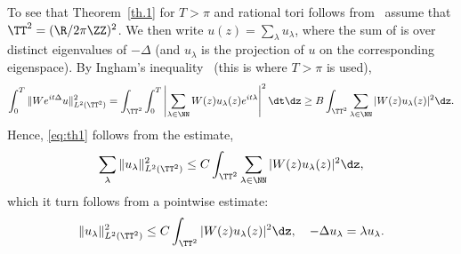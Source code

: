 To see that Theorem~\ref{th.1} for $ T > \pi $ and rational tori follows from~\cite[Theorem~1.2]{Jak} assume that $ \TT^2 = (\R/2\pi \ZZ)^2 $. We then write $ u (z) = \sum_{ \lambda } u_\lambda $, where the sum of is over distinct eigenvalues of $ - \Delta $ (and $u_\lambda$ is the projection of $u$ on the corresponding eigenspace). By Ingham's inequality~\cite{ing} (this is where $ T > \pi $ is used),
\[
\int_0^T \| W e^{ it \Delta} u \|^2_{ L^2 (\TT^2)} =
\int_{\TT^2 } \int_0^T \left| \sum_{ \lambda \in \NN } W(z) u_\lambda (z) e^{i t \lambda } \right|^2 \dt \dz \geq B
\int_{\TT^2} \sum_{ \lambda \in \NN } | W (z) u_\lambda (z) |^2 \dz.
\]
Hence, \eqref{eq:th1} follows from the estimate,
\begin{equation}\label{eq:Jak}
\sum_{ \lambda } \| u_\lambda\|^2_{L^2 (\TT^2) } \leq C \int_{\TT^2} \sum_{ \lambda \in \NN } | W (z) u_\lambda (z) |^2 \dz,
\end{equation}
which it turn follows from a pointwise estimate:
\begin{equation}\label{eq:Jak1}
\| u_\lambda\|^2_{L^2 (\TT^2) } \leq C \int_{\TT^2} | W (z) u_\lambda (z) |^2 \dz, \ \ \ - \Delta u_\lambda = \lambda u_\lambda.
\end{equation}

